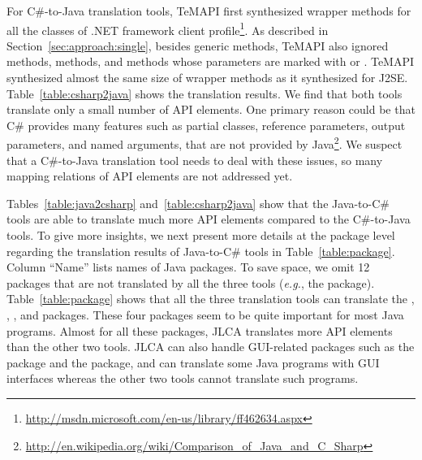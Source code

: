 For C\#-to-Java translation tools, TeMAPI first synthesized wrapper methods for all the classes of .NET framework client profile\footnote{\url{http://msdn.microsoft.com/en-us/library/ff462634.aspx}}. As described in Section~\ref{sec:approach:single}, besides generic methods, TeMAPI also ignored  methods,  methods, and methods whose parameters are marked with  or . TeMAPI synthesized almost the same size of wrapper methods as it synthesized for J2SE. Table~\ref{table:csharp2java} shows the translation results. We find that both tools translate only a small number of API elements. One primary reason could be that C\# provides many features such as partial classes, reference parameters, output parameters, and named arguments, that are not provided by Java\footnote{\url{http://en.wikipedia.org/wiki/Comparison_of_Java_and_C_Sharp}}. We suspect that a C\#-to-Java translation tool needs to deal with these issues, so many mapping relations of API elements are not addressed yet.

Tables~\ref{table:java2csharp} and~\ref{table:csharp2java} show that the Java-to-C\# tools are able to translate much more API elements compared to the C\#-to-Java tools. To give more insights, we next present more details at the package level regarding the translation results of Java-to-C\# tools in Table~\ref{table:package}. Column ``Name'' lists names of Java packages. To save space, we omit 12 packages that are not translated by all the three tools (\emph{e.g.}, the  package). Table~\ref{table:package} shows that all the three translation tools can translate the , , , and  packages. These four packages seem to be quite important for most Java programs. Almost for all these packages, JLCA translates more API elements than the other two tools. JLCA can also handle GUI-related packages such as the  package and the  package, and can translate some Java programs with GUI interfaces whereas the other two tools cannot translate such programs.

